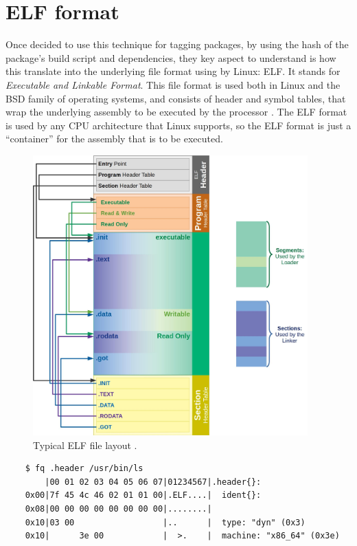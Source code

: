 \FloatBarrier
\section{ELF format}

Once decided to use this technique for tagging packages, by
using the hash of the package's build script and
dependencies, they key aspect to understand is how this
translate into the underlying file format using by Linux:
ELF. It stands for \textit{Executable and Linkable Format}.
This file format is used both in Linux and the BSD family of
operating systems, and consists of header and symbol tables,
that wrap the underlying assembly to be executed by the
processor \cite{LinuxFoundationReferenced}. The ELF format
is used by any CPU architecture that Linux supports, so the
ELF format is just a ``container'' for the assembly that is
to be executed.

\begin{figure}[hbt]
    \centerfloat
    \includegraphics[width=300pt]{assets/typical_elf.jpg}
    \caption{Typical ELF file layout \cite{HW3238POperating}
    .}
    \label{fig:elf-layout}
\end{figure}


    \begin{verbatim}
    $ fq .header /usr/bin/ls
        |00 01 02 03 04 05 06 07|01234567|.header{}:
    0x00|7f 45 4c 46 02 01 01 00|.ELF....|  ident{}:
    0x08|00 00 00 00 00 00 00 00|........|
    0x10|03 00                  |..      |  type: "dyn" (0x3)
    0x10|      3e 00            |  >.    |  machine: "x86_64" (0x3e)
    \end{verbatim}


